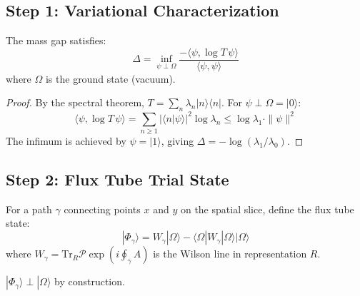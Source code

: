 \subsection{Step 1: Variational Characterization}

\begin{lemma}
\label{lem:variational-gap}
The mass gap satisfies:
\begin{equation}
\Delta = \inf_{\psi \perp \Omega} \frac{-\langle \psi, \log T \, \psi \rangle}{\langle \psi, \psi \rangle}
\end{equation}
where $\Omega$ is the ground state (vacuum).
\end{lemma}

\begin{proof}
By the spectral theorem, $T = \sum_n \lambda_n |n\rangle \langle n|$. For $\psi \perp \Omega = |0\rangle$:
\begin{equation}
\langle \psi, \log T \, \psi \rangle = \sum_{n \geq 1} |\langle n|\psi\rangle|^2 \log \lambda_n \leq \log \lambda_1 \cdot \|\psi\|^2
\end{equation}
The infimum is achieved by $\psi = |1\rangle$, giving $\Delta = -\log(\lambda_1/\lambda_0)$.
\end{proof}

\subsection{Step 2: Flux Tube Trial State}

\begin{definition}
For a path $\gamma$ connecting points $x$ and $y$ on the spatial slice, define the flux tube state:
\begin{equation}
|\Phi_\gamma\rangle = W_\gamma |\Omega\rangle - \langle \Omega | W_\gamma | \Omega \rangle |\Omega\rangle
\end{equation}
where $W_\gamma = \mathrm{Tr}_R \mathcal{P}\exp\left(i\oint_\gamma A\right)$ is the Wilson line in representation $R$.
\end{definition}

\begin{lemma}[Orthogonality]
$|\Phi_\gamma\rangle \perp |\Omega\rangle$ by construction.
\end{lemma}

